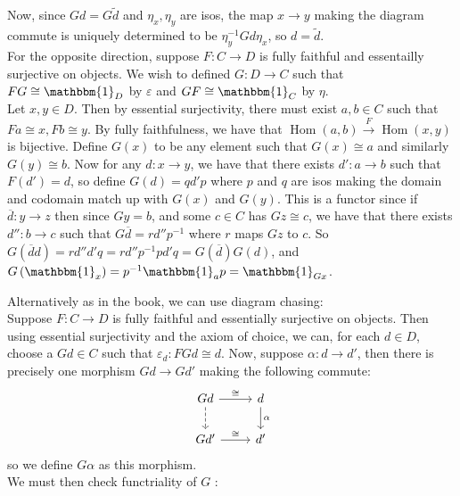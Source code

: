 \documentclass[a4paper]{article}
\theoremstyle{plain}%
\theoremstyle{definition}
\theoremstyle{remark}
\DeclareMathOperator{\Hom}{Hom}
\begin{document}
Now, since $Gd = G\tilde{d}$ and $\eta_x, \eta_y$ are isos, the map $x\to y$
making the diagram commute is uniquely determined to be 
$\eta_y^{-1} Gd \eta_x$, so $d = \tilde{d}$.\\
\linebreak
For the opposite direction, suppose $F  \colon C \to D$ is fully faithful and essentailly
surjective on objects. 
We wish to defined $G  \colon D \to C$ such that
$FG \cong \mathbbm{1}_D$ by $\varepsilon$ and $GF \cong \mathbbm{1}_C$ by
$\eta$.\\
Let $x,y \in D$. Then by essential surjectivity, there must exist $a,b \in C$
such that $Fa \cong x, Fb \cong y$. By fully faithfulness, we have that
$\Hom(a,b) \stackrel{F}{\to } \Hom(x,y)$ is bijective. Define
$G(x)$ to be any element such that $G(x) \cong a$ and similarly  $G(y) \cong
b$. Now for any  $d  \colon x \to y$, we have that there exists $d'  \colon
a \to b$ such that $F(d') = d$, so define $G(d) =q d' p$ where $p $ and $q$ are
isos making the domain and codomain match up with $G(x)$ and $G(y)$. This is
a functor since if $\overline{d}  \colon y \to z$ then
since $Gy = b$, and some $c \in C$ has $Gz \cong c$, we have that
there exists $d''  \colon b \to c$ such that
$G \overline{d} = r d'' p^{-1}$ where $r$ maps $Gz$ to $c$. So
$G \left( \overline{d} d  \right) 
= r d'' d' q = r d'' p^{-1}p d' q
= G(\overline{d}) G(d)$, and $G\left( \mathbbm{1}_x \right) 
= p^{-1} \mathbbm{1}_a p = \mathbbm{1}_{Gx}$.\\
\linebreak

Alternatively as in the book, we can use diagram chasing:\\
Suppose $F  \colon C \to D$ is fully faithful and essentially surjective on
objects. Then using essential surjectivity and the axiom of choice, we can, for
each $d \in D$, choose a $Gd \in C$ such that $\varepsilon_d  \colon FGd \cong
d$. Now, suppose $\alpha  \colon d \to d'$, then there is precisely one
morphism
$G d \to Gd'$ making the following commute:
\begin{equation*}
\begin{tikzcd}
    Gd \ar[d, dashed] \ar[r, "\cong"] & d \ar[d, "\alpha"] \\
    Gd' \ar[r, "\cong"] & d'
\end{tikzcd}
\end{equation*}
so we define
$G \alpha$ as this morphism.\\
\linebreak
We must then check functriality of $G$ :\\
\end{document}
